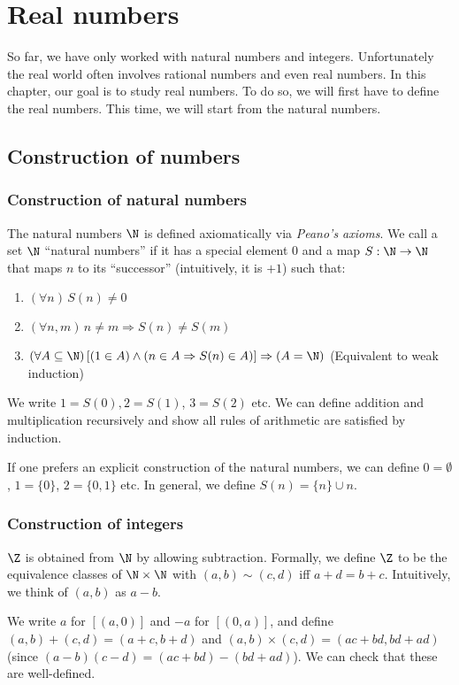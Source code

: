 \documentclass[a4paper]{article}
\begin{document}
\section{Real numbers}
So far, we have only worked with natural numbers and integers. Unfortunately the real world often involves rational numbers and even real numbers. In this chapter, our goal is to study real numbers. To do so, we will first have to define the real numbers. This time, we will start from the natural numbers.
\subsection{Construction of numbers}
\subsubsection*{Construction of natural numbers}
\begin{defi}
  The natural numbers $\N$ is defined axiomatically via \emph{Peano's axioms}. We call a set $\N$ ``natural numbers'' if it has a special element $0$ and a map $S: \N \to \N$ that maps $n$ to its ``successor'' (intuitively, it is $+1$) such that:
  \begin{enumerate}
    \item $(\forall n)\,S(n) \not= 0$
    \item $(\forall n, m)\,n \not= m\Rightarrow S(n)\not= S(m)$
    \item $(\forall A\subseteq \N)\,[(1\in A)\wedge (n\in A\Rightarrow S(n)\in A)]\Rightarrow (A = \N)$ (Equivalent to weak induction)
  \end{enumerate}
  We write $1 = S(0), 2 = S(1)$, $3 = S(2)$ etc. We can define addition and multiplication recursively and show all rules of arithmetic are satisfied by induction.
\end{defi}
If one prefers an explicit construction of the natural numbers, we can define $0 = \emptyset$, $1 = \{0\}$, $2 = \{0, 1\}$ etc. In general, we define $S(n) = \{n\} \cup n$.

\subsubsection*{Construction of integers}
\begin{defi}[Integers]
  $\Z$ is obtained from $\N$ by allowing subtraction. Formally, we define $\Z$ to be the equivalence classes of $\N\times \N$ with $(a, b) \sim (c, d)$ iff $a + d = b + c$. Intuitively, we think of $(a, b)$ as $a - b$.

  We write $a$ for $[(a, 0)]$ and $-a$ for $[(0, a)]$, and define $(a, b) + (c, d) = (a + c, b + d)$ and $(a, b)\times (c, d) = (ac + bd, bd + ad)$ (since $(a - b)(c - d) = (ac + bd) - (bd + ad)$). We can check that these are well-defined.
\end{defi}
\end{document}
